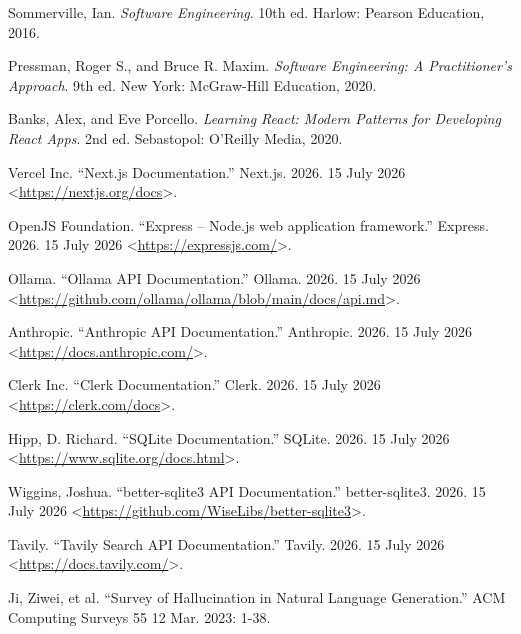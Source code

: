 \documentclass[12pt,a4paper,oneside]{report}
\begin{document}
\begin{singlespace}
\noindent
[1] Sommerville, Ian. \emph{Software Engineering}. 10th ed. Harlow:
Pearson Education, 2016.

\vspace{\baselineskip}
\noindent
[2] Pressman, Roger S., and Bruce R. Maxim. \emph{Software
Engineering: A Practitioner's Approach}. 9th ed. New York:
McGraw-Hill Education, 2020.

\vspace{\baselineskip}
\noindent
[3] Banks, Alex, and Eve Porcello. \emph{Learning React: Modern
Patterns for Developing React Apps}. 2nd ed. Sebastopol: O'Reilly
Media, 2020.

\vspace{\baselineskip}
\noindent
[4] Vercel Inc. ``Next.js Documentation.'' Next.js. 2026. 15 July 2026
<\url{https://nextjs.org/docs}>.

\vspace{\baselineskip}
\noindent
[5] OpenJS Foundation. ``Express -- Node.js web application
framework.'' Express. 2026. 15 July 2026 <\url{https://expressjs.com/}>.

\vspace{\baselineskip}
\noindent
[6] Ollama. ``Ollama API Documentation.'' Ollama. 2026. 15 July 2026
<\url{https://github.com/ollama/ollama/blob/main/docs/api.md}>.

\vspace{\baselineskip}
\noindent
[7] Anthropic. ``Anthropic API Documentation.'' Anthropic. 2026.
15 July 2026 <\url{https://docs.anthropic.com/}>.

\vspace{\baselineskip}
\noindent
[8] Clerk Inc. ``Clerk Documentation.'' Clerk. 2026. 15 July 2026
<\url{https://clerk.com/docs}>.

\vspace{\baselineskip}
\noindent
[9] Hipp, D. Richard. ``SQLite Documentation.'' SQLite. 2026.
15 July 2026 <\url{https://www.sqlite.org/docs.html}>.

\vspace{\baselineskip}
\noindent
[10] Wiggins, Joshua. ``better-sqlite3 API Documentation.''
better-sqlite3. 2026. 15 July 2026
<\url{https://github.com/WiseLibs/better-sqlite3}>.

\vspace{\baselineskip}
\noindent
[11] Tavily. ``Tavily Search API Documentation.'' Tavily. 2026.
15 July 2026 <\url{https://docs.tavily.com/}>.

\vspace{\baselineskip}
\noindent
[12] Ji, Ziwei, et al. ``Survey of Hallucination in Natural Language
Generation.'' ACM Computing Surveys 55 12 Mar. 2023: 1-38.
\end{singlespace}
\end{document}
